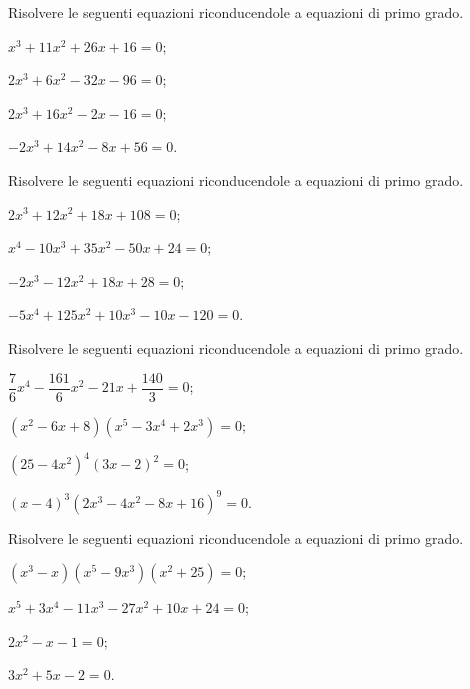 \begin{esercizio}[\Ast]
\label{ese:20.8}
Risolvere le seguenti equazioni riconducendole a equazioni di primo grado.
\begin{multicols}{2}
\begin{enumeratea}
 \item $x^{3}+11x^{2}+26x+16=0$;
 \item $2x^{3}+6x^{2}-32x-96=0$;
 \item $2x^{3}+16x^{2}-2x-16=0$;
 \item $-2x^{3}+14x^{2}-8x+56=0$.
\end{enumeratea}
\end{multicols}
\end{esercizio}
\begin{esercizio}[\Ast]
\label{ese:20.9}
Risolvere le seguenti equazioni riconducendole a equazioni di primo grado.
\begin{multicols}{2}
\begin{enumeratea}
 \item $2x^{3}+12x^{2}+18x+108=0$;
 \item $x^{4}-10x^{3}+35x^{2}-50x+24=0$;
 \item $-2x^{3}-12x^{2}+18x+28=0$;
 \item $-5x^{4}+125x^{2}+10x^{3}-10x-120=0$.
\end{enumeratea}
\end{multicols}
\end{esercizio}

\begin{esercizio}[\Ast]
\label{ese:20.10}
Risolvere le seguenti equazioni riconducendole a equazioni di primo grado.
\begin{multicols}{2}
\begin{enumeratea}
 \item $\dfrac{7}{6}x^{4}-\dfrac{161}{6}x^{2}-21x+\dfrac{140}{3}=0$;
 \item $(x^{2}-6x+8)(x^{5}-3x^{4}+2x^{3})=0$;
 \item $\left(25-4x^{2}\right)^{4}\left(3x-2\right)^{2}=0$;
 \item $(x-4)^{3}\left(2x^{3}-4x^{2}-8x+16\right)^{9}=0$.
\end{enumeratea}
\end{multicols}
\end{esercizio}

\begin{esercizio}[\Ast]
\label{ese:20.11}
Risolvere le seguenti equazioni riconducendole a equazioni di primo grado.
\begin{multicols}{2}
\begin{enumeratea}
 \item $(x^{3}-x)(x^{5}-9x^{3})(x^{2}+25)=0$;
 \item $x^{5}+3x^{4}-11x^{3}-27x^{2}+10x+24=0$;
 \item $2x^{2}-x-1=0$;
 \item $3x^{2}+5x-2=0$.
\end{enumeratea}
\end{multicols}
\end{esercizio}

